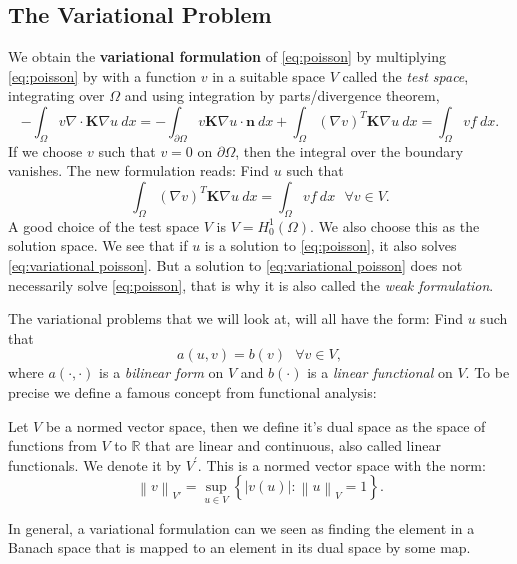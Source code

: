 \documentclass[../Main/main.tex]{subfiles}
\begin{document}
	\subsection{The Variational Problem}

	We obtain the \textbf{variational formulation} of \eqref{eq:poisson} by multiplying \eqref{eq:poisson} by with a function $v$ in a suitable space $V$ called the \emph{test space}, integrating over $\Omega$ and using integration by parts/divergence theorem,
	\begin{equation*}
		-\int_{\Omega}v\nabla \cdot\bm{K}\nabla u \ dx = -\int_{\partial \Omega}v \bm{K}\nabla u \cdot \bm{n} \ dx + \int_{\Omega}(\nabla v)^{T}\bm{K} \nabla u \ dx = \int_{\Omega}vf\ dx.
	\end{equation*}
	If we choose $v$ such that $v=0$ on $\partial \Omega$, then the integral over the boundary vanishes. The new formulation reads: Find $u$ such that 
	\begin{equation}\label{eq:variational poisson}
			 \int_{\Omega}(\nabla v)^T \bm{K} \nabla u \ dx = \int_{\Omega}vf\ dx \ \ \  \forall v \in V.
	\end{equation}
	A good choice of the test space $V$ is $V=H_0^1(\Omega)$. We also choose this as the solution space.
	We see that if $u$ is a solution to \eqref{eq:poisson}, it also solves \eqref{eq:variational poisson}. But a solution to \eqref{eq:variational poisson} does not necessarily solve \eqref{eq:poisson}, that is why it is also called the \emph{weak formulation}.\par
	The variational problems that we will look at, will all have the form: Find $u$ such that
	\begin{equation}\label{eq:variational problem}
			a(u,v) = b(v) \ \ \ \forall v \in V,
	\end{equation}
	where $a(\cdot,\cdot)$ is a \emph{bilinear form} on $V$ and $b(\cdot)$ is a \emph{linear functional} on $V$. To be precise we define a famous concept from functional analysis:
	\begin{definition}
		Let $V$ be a normed vector space, then we define it's dual space as the space of functions from $V$ to $\mathbb{R}$ that are linear and continuous, also called linear functionals. We denote it by $V^{'}$. This is a normed vector space with the norm: \begin{equation*}
\left \| v \right \|_{V'} = \sup_{u\in V} \left \{ |v(u)|:\left \| u\right \|_V = 1 \right \}. 		\end{equation*}
	\end{definition}
	In general, a variational formulation can we seen as finding the element in a Banach space that is mapped to an element in its dual space by some map.
\end{document}
